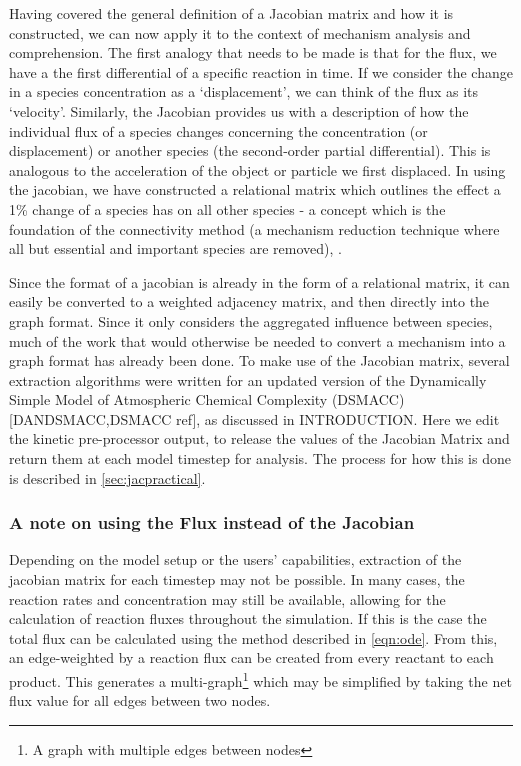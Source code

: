Having covered the general definition of a Jacobian matrix and how it is constructed, we can now apply it to the context of mechanism analysis and comprehension. The first analogy that needs to be made is that for the flux, we have a the first differential of a specific reaction in time. If we consider the change in a species concentration as a `displacement', we can think of the flux as its `velocity'.
Similarly, the Jacobian provides us with a description of how the individual flux of a species changes concerning the concentration (or displacement) or another species (the second-order partial differential). This is analogous to the acceleration of the object or particle we first displaced. In using the jacobian, we have constructed a relational matrix which outlines the effect a 1\% change of a species has on all other species - a concept which is the foundation of the connectivity method (a mechanism reduction technique where all but essential and important species are removed), \citep{connectivity}.

Since the format of a jacobian is already in the form of a relational matrix, it can easily be converted to a weighted adjacency matrix, and then directly into the graph format. Since it only considers the aggregated influence between species, much of the work that would otherwise be needed to convert a mechanism into a graph format has already been done. To make use of the Jacobian matrix, several extraction algorithms were written for an updated version of the Dynamically Simple Model of Atmospheric Chemical Complexity (DSMACC) [DANDSMACC,DSMACC ref], as discussed in INTRODUCTION. Here we edit the kinetic pre-processor output, \citep{kpp} to release the values of the Jacobian Matrix and return them at each model timestep for analysis. The process for how this is done is described in \autoref{sec:jacpractical}.



\subsubsection*{ A note on using the Flux instead of the Jacobian }
Depending on the model setup or the users' capabilities, extraction of the jacobian matrix for each timestep may not be possible. In many cases, the reaction rates and concentration may still be available, allowing for the calculation of reaction fluxes throughout the simulation. If this is the case the total flux can be calculated using the method described in  \autoref{eqn:ode}. From this, an edge-weighted by a reaction flux can be created from every reactant to each product. This generates a multi-graph\footnote{A graph with multiple edges between nodes} which may be simplified by taking the net flux value for all edges between two nodes. 

